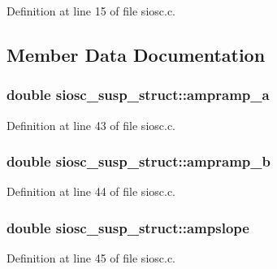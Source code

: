 Definition at line 15 of file siosc.\+c.



\subsection{Member Data Documentation}
\subsubsection[{\texorpdfstring{ampramp\+\_\+a}{ampramp_a}}]{\setlength{\rightskip}{0pt plus 5cm}double siosc\+\_\+susp\+\_\+struct\+::ampramp\+\_\+a}\hypertarget{structsiosc__susp__struct_ad733bac01c315e5afc93ffc4bef0e41c}{}\label{structsiosc__susp__struct_ad733bac01c315e5afc93ffc4bef0e41c}


Definition at line 43 of file siosc.\+c.

\subsubsection[{\texorpdfstring{ampramp\+\_\+b}{ampramp_b}}]{\setlength{\rightskip}{0pt plus 5cm}double siosc\+\_\+susp\+\_\+struct\+::ampramp\+\_\+b}\hypertarget{structsiosc__susp__struct_a7378d3d08c8d3f50bd099a722d607329}{}\label{structsiosc__susp__struct_a7378d3d08c8d3f50bd099a722d607329}


Definition at line 44 of file siosc.\+c.

\subsubsection[{\texorpdfstring{ampslope}{ampslope}}]{\setlength{\rightskip}{0pt plus 5cm}double siosc\+\_\+susp\+\_\+struct\+::ampslope}\hypertarget{structsiosc__susp__struct_a5ac09cbe99fbd384e40907b319b7bd51}{}\label{structsiosc__susp__struct_a5ac09cbe99fbd384e40907b319b7bd51}


Definition at line 45 of file siosc.\+c.

